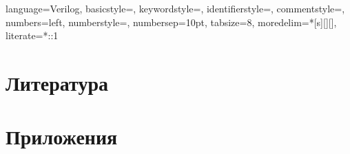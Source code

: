 \def\documentauthorname         {Рафаел Динев Калъчев}
\def\documentauthoremail        {kalachev.rafael@gmail.com}
\def\documenttitle              {Платформа за безпилотен летателен апарат с четири ротора}
\def\documenttitleshort         {Платформа за безпилотен летателен апарат с четири ротора}
\def\documentsubject            {}
\def\documentkeywords           {embeded,quadrotor,automation,microcontroller,control,drone}
\def\documenttype               {Дипломна работа}
\def\documentlocation           {Технически Университет София}





{
    language=Verilog,
    basicstyle=\small\ttfamily,
    keywordstyle=\color{vblue},
    identifierstyle=\color{black},
    commentstyle=\color{vgreen},
    numbers=left,
    numberstyle=\tiny\color{black},
    numbersep=10pt,
    tabsize=8,
    moredelim=*[s][]{[}{]},
    literate=*{:}{:}1
}


\makeatletter
\newcommand*\@lbracket{[}
\newcommand*\@rbracket{]}
\newcommand*\@colon{:}
\newcommand*\colorIndex{%
    \edef\@temp{\the\lst@token}%
    \ifx\@temp\@lbracket \color{black}%
    \else\ifx\@temp\@rbracket \color{black}%
    \else\ifx\@temp\@colon \color{black}%
    \else \color{vorange}%
    \fi\fi\fi
}
\makeatother

\lstset{style=verilog-style}
\makeatletter
\renewcommand{\@seccntformat}[1]{}
\makeatother

\setlength{\parindent}{.5em}
\setlength{\parskip}{1em}
\linespread{1.25}





\tableofcontents
\listoffigures
\listoftables
\newpage










\section{Литература}




\section{Приложения}

\begin{appendix}
\end{appendix}


